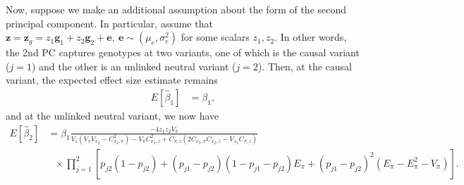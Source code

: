 \documentclass[12pt]{article}
\begin{document}
%

Now, suppose we make an additional assumption about the form of the second principal component.
In particular, assume that $\mathbf{z} = \mathbf{z}_g = z_1 \mathbf{g}_1 + z_2 \mathbf{g}_2 + \mathbf{e}, \ \mathbf{e} \sim (\mu_e, \sigma_e^2)$ for some scalars $z_1, z_2$. 
In other words, the 2nd PC captures genotypes at two variants, one of which is the causal variant ($j = 1$) and the other is an unlinked neutral variant ($j = 2$). 
Then, at the causal variant, the expected effect size estimate remains
\begin{align*}
E[\hat\beta_1] 
&= \beta_1,
\end{align*}
%
and at the unlinked neutral variant, we now have
\begin{align*}
E[\hat\beta_2] 
&=  \beta_1 \frac{-4z_1z_2V_\pi}
  {V_z(V_\pi V_{x_2} - C_{x_2,\pi}^2) - V_\pi C_{x_2,z}^2 + C_{\pi,z}(2C_{x_2,\pi}C_{x_2,z} - V_{x_2}C_{\pi,z})}\\                      
& \ \ \ \times \prod_{j=1}^2 [p_{j2}(1-p_{j2}) + (p_{j1}-p_{j2})(1-p_{j1}-p_{j2})E_\pi + (p_{j1}-p_{j2})^2(E_\pi- E_\pi^2 - V_\pi)].
\end{align*}
\end{document}

